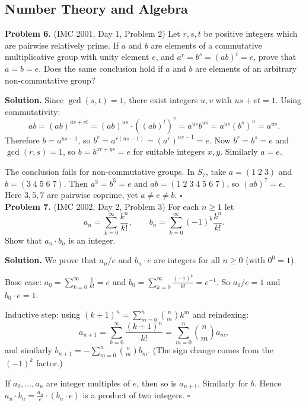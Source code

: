 \documentclass{article}
\begin{document}
\newpage

\subsection*{Number Theory and Algebra}

\textbf{Problem 6.} (IMC 2001, Day 1, Problem 2)
Let \( r, s, t \) be positive integers which are pairwise relatively prime. If \( a \) and \( b \) are elements of a commutative multiplicative group with unity element \( e \), and \( a^r = b^s = (ab)^t = e \), prove that \( a = b = e \). Does the same conclusion hold if \( a \) and \( b \) are elements of an arbitrary non-commutative group?

\textbf{Solution.}
Since \( \gcd(s, t) = 1 \), there exist integers \( u, v \) with \( us + vt = 1 \). Using commutativity:
\[
ab = (ab)^{us+vt} = (ab)^{us} \cdot ((ab)^t)^v = a^{us} b^{us} = a^{us} (b^s)^u = a^{us}.
\]
Therefore \( b = a^{us - 1} \), so \( b^r = a^{r(us-1)} = (a^r)^{us-1} = e \). Now \( b^r = b^s = e \) and \( \gcd(r, s) = 1 \), so \( b = b^{xr + ys} = e \) for suitable integers \( x, y \). Similarly \( a = e \).

The conclusion fails for non-commutative groups. In \( S_7 \), take \( a = (1\;2\;3) \) and \( b = (3\;4\;5\;6\;7) \). Then \( a^3 = b^5 = e \) and \( ab = (1\;2\;3\;4\;5\;6\;7) \), so \( (ab)^7 = e \). Here \( 3, 5, 7 \) are pairwise coprime, yet \( a \neq e \neq b \). \hfill\(\square\)
\\

\textbf{Problem 7.} (IMC 2002, Day 2, Problem 3)
For each \( n \geq 1 \) let
\[
a_n = \sum_{k=0}^{\infty} \frac{k^n}{k!}, \qquad b_n = \sum_{k=0}^{\infty} (-1)^k \frac{k^n}{k!}.
\]
Show that \( a_n \cdot b_n \) is an integer.

\textbf{Solution.}
We prove that \( a_n / e \) and \( b_n \cdot e \) are integers for all \( n \geq 0 \) (with \( 0^0 = 1 \)).

Base case: \( a_0 = \sum_{k=0}^{\infty} \frac{1}{k!} = e \) and \( b_0 = \sum_{k=0}^{\infty} \frac{(-1)^k}{k!} = e^{-1} \). So \( a_0/e = 1 \) and \( b_0 \cdot e = 1 \).

Inductive step: using \( (k+1)^n = \sum_{m=0}^{n} \binom{n}{m} k^m \) and reindexing:
\[
a_{n+1} = \sum_{k=0}^{\infty} \frac{(k+1)^n}{k!} = \sum_{m=0}^{n} \binom{n}{m} a_m,
\]
and similarly \( b_{n+1} = -\sum_{m=0}^{n} \binom{n}{m} b_m \). (The sign change comes from the \( (-1)^k \) factor.)

If \( a_0, \ldots, a_n \) are integer multiples of \( e \), then so is \( a_{n+1} \). Similarly for \( b \). Hence \( a_n \cdot b_n = \frac{a_n}{e} \cdot (b_n \cdot e) \) is a product of two integers. \hfill\(\square\)
\\
\end{document}
